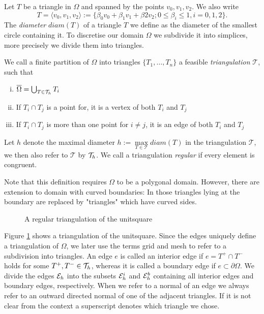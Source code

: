 Let $T$ be a triangle in $\Omega$ and spanned by the points $v_0, v_1, v_2$. We also write 
\[
	T= \langle v_0, v_1, v_2 \rangle := \{\beta_0 v_0+ \beta_1 v_1 +\beta2 v_2; 0 \leq \beta_i \leq 1, i= 0,1,2\}.
\]
The \emph{diameter} $diam(T)$ of a triangle $T$ we define as the diameter of the smallest circle containing it.
To discretise our domain $\Omega$ we subdivide it into simplices, more precisely we divide them into triangles.
\begin{definition}
	We call a finite partition of $\Omega$ into triangles $\{T_1, \dots, T_n\}$ a feasible \emph{triangulation} $\mathcal{T}$, such that
	\begin{enumerate}[(i)]
		\item	$\overline \Omega = \bigcup_{T \in \mathcal{T}_h} T_i$
		\item If $T_i \cap T_j$ is a point for, it is a vertex of both $T_i$ and $T_j$
		\item If $T_i \cap T_j$ is more than one point for $i \neq j$, it is an edge of both $T_i$ and $T_j$
	\end{enumerate}
	Let $h$ denote the maximal diameter $h:= \operatorname{max}\limits_{T\in \mathcal T} diam(T)$ in the triangulation $\mathcal T$, we then also refer to $\mathcal{T}$ by $\mathcal{T}_h$. We call a triangulation \emph{regular} if every element is congruent.
\end{definition}
Note that this definition requires $\Omega$ to be a polygonal domain. However, there are extension to domain with curved boundaries: In those triangles lying at the boundary are replaced by "triangles" which have curved sides. 

\begin{figure}[H]

\caption{A regular triangulation of the unitsquare}
 \label{fig: triangulation}
\end{figure}

Figure \ref{fig: triangulation} shows a triangulation of the unitsquare. Since the edges uniquely define a triangulation of $\Omega$, we later use the terms grid and mesh to refer to a subdivision into triangles.
An edge $e$ is called an interior edge if $e=T^+ \cap T^-$ holds for some $T^+,T^- \in \mathcal{T}_h$, whereas it is called a boundary edge if $e \subset \partial \Omega$.
We divide the edges $\mathcal{E}_h$ into the subsets $\mathcal{E}_h^i$ and $\mathcal{E}_h^b$ containing all interior edges and boundary edges, respectively. 
When we refer to a normal of an edge we always refer to an outward directed normal of one of the adjacent triangles. If it is not clear from the context a superscript denotes which triangle we chose.

